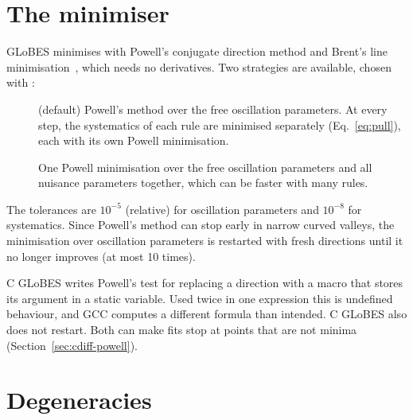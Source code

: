 \section{The minimiser}\label{sec:minimizer}

GLoBES minimises with Powell's conjugate direction method and Brent's line
minimisation~\cite{NR}, which needs no derivatives. Two strategies are
available, chosen with :
\begin{description}
\item[] (default) Powell's method over the free oscillation
  parameters. At every step, the systematics of each rule are minimised
  separately (Eq.~\eqref{eq:pull}), each with its own Powell minimisation.
\item[] One Powell minimisation over the free oscillation
  parameters and all nuisance parameters together, which can be faster with
  many rules.
\end{description}
The tolerances are $10^{-5}$ (relative) for oscillation parameters and
$10^{-8}$ for systematics. Since Powell's method can stop early in narrow
curved valleys, the minimisation over oscillation parameters is restarted with
fresh directions until it no longer improves (at most 10 times).

\begin{cdiff}
C GLoBES writes Powell's test for replacing a direction with a macro
 that stores its argument in a static variable. Used twice in one
expression this is undefined behaviour, and GCC computes a different formula
than intended. C GLoBES also does not restart. Both can make fits stop at
points that are not minima (Section~\ref{sec:cdiff-powell}).
\end{cdiff}

\section{Degeneracies}\label{sec:degeneracies}

